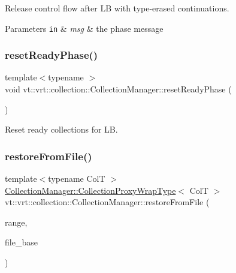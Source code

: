 Release control flow after LB with type-\/erased continuations. 


\begin{DoxyParams}[1]{Parameters}
\mbox{\tt in}  & {\em msg} & the phase message \\
\hline
\end{DoxyParams}
\mbox{\label{structvt_1_1vrt_1_1collection_1_1_collection_manager_af93d07828954a649201ef3fe463bf530}} 
\subsubsection{\texorpdfstring{reset\+Ready\+Phase()}{resetReadyPhase()}}
{\footnotesize\ttfamily template$<$typename $>$ \\
void vt\+::vrt\+::collection\+::\+Collection\+Manager\+::reset\+Ready\+Phase (\begin{DoxyParamCaption}{ }\end{DoxyParamCaption})}



Reset ready collections for LB. 

\mbox{\label{structvt_1_1vrt_1_1collection_1_1_collection_manager_a315a74b9299f31ebc5e3e4becdd9f79e}} 
\subsubsection{\texorpdfstring{restore\+From\+File()}{restoreFromFile()}}
{\footnotesize\ttfamily template$<$typename ColT $>$ \\
\hyperlink{structvt_1_1vrt_1_1collection_1_1_collection_manager_a56458ed7f9bb22b631b9b3a745f42f94}{Collection\+Manager\+::\+Collection\+Proxy\+Wrap\+Type}$<$ ColT $>$ vt\+::vrt\+::collection\+::\+Collection\+Manager\+::restore\+From\+File (\begin{DoxyParamCaption}\item[{typename Col\+T\+::\+Index\+Type}]{range,  }\item[{std\+::string const \&}]{file\+\_\+base }\end{DoxyParamCaption})}



